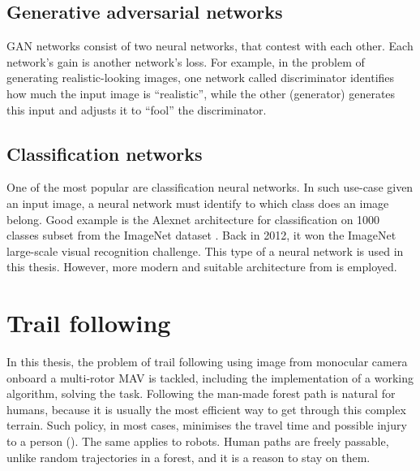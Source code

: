 \subsection{Generative adversarial networks}

GAN networks consist of two neural networks, that contest with each other. Each network's gain is another network's loss. For example, in the problem of generating realistic-looking images, one network called discriminator identifies how much the input image is \enquote{realistic}, while the other (generator) generates this input and adjusts it to \enquote{fool} the discriminator.

\subsection{Classification networks}

One of the most popular are classification neural networks. In such use-case given an input image, a neural network must identify to which class does an image belong. Good example is the Alexnet architecture for classification on 1000 classes subset from the ImageNet dataset \cite{krizhevsky2012imagenet}. Back in 2012, it won the ImageNet large-scale visual recognition challenge. This type of a neural network is used in this thesis. However, more modern and suitable architecture from \cite{giusti2016machine} is employed.

\section{Trail following}

In this thesis, the problem of trail following using image from monocular camera onboard a multi-rotor \acs{MAV} is tackled, including the implementation of a working algorithm, solving the task. Following the man-made forest path is natural for humans, because it is usually the most efficient way to get through this complex terrain. Such policy, in most cases, minimises the travel time and possible injury to a person (). The same applies to robots. Human paths are freely passable, unlike random trajectories in a forest, and it is a reason to stay on them.


